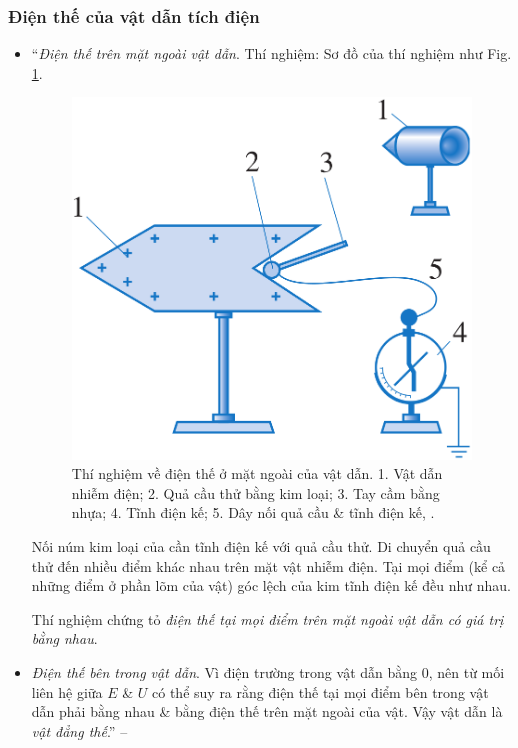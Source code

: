 \documentclass[oneside]{book}
\numberwithin{equation}{section}
\begin{document}
\subsubsection{Điện thế của vật dẫn tích điện}
\begin{itemize}
	\item ``\textit{Điện thế trên mặt ngoài vật dẫn}. Thí nghiệm: Sơ đồ của thí nghiệm như Fig. \ref{fig:thi_nghiem_dien_the_mat_ngoai_vat_dan}.
	
	\begin{figure}[H]
		\centering
		\includegraphics[scale=0.15]{thi_nghiem_dien_the_mat_ngoai_vat_dan}
		\caption{Thí nghiệm về điện thế ở mặt ngoài của vật dẫn. 1. Vật dẫn nhiễm điện; 2. Quả cầu thử bằng kim loại; 3. Tay cầm bằng nhựa; 4. Tĩnh điện kế; 5. Dây nối quả cầu \& tĩnh điện kế, \cite[Hình 6.2, p. 29]{SGK_Vat_Ly_11_nang_cao}.}
		\label{fig:thi_nghiem_dien_the_mat_ngoai_vat_dan}
	\end{figure}
	Nối núm kim loại của cần tĩnh điện kế với quả cầu thử. Di chuyển quả cầu thử đến nhiều điểm khác nhau trên mặt vật nhiễm điện. Tại mọi điểm (kể cả những điểm ở phần lõm của vật) góc lệch của kim tĩnh điện kế đều như nhau.
	
	Thí nghiệm chứng tỏ \textit{điện thế tại mọi điểm trên mặt ngoài vật dẫn có giá trị bằng nhau}.
	\item \textit{Điện thế bên trong vật dẫn}. Vì điện trường trong vật dẫn bằng 0, nên từ mối liên hệ giữa $E$ \& $U$ có thể suy ra rằng điện thế tại mọi điểm bên trong vật dẫn phải bằng nhau \& bằng điện thế trên mặt ngoài của vật. Vậy vật dẫn là \textit{vật đẳng thế}.'' -- \cite[p. 29]{SGK_Vat_Ly_11_nang_cao}
\end{itemize}
\end{document}
